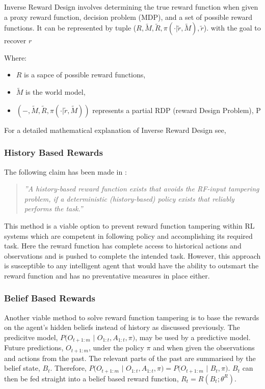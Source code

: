 Inverse Reward Design involves determining the true reward function when given a proxy reward function, decision problem (MDP), and a set of possible reward functions.
It can be represented by tuple ($R, \tilde{M}, \tilde{R}, \pi(\cdot|\tilde{r}, \tilde{M}), \tilde{r}$).
with the goal to recover $r$

Where:
\begin{itemize}
    \item $R$ is a sapce of possible reward functions,
    \item $\tilde{M}$ is the world model,
    \item $(-, \tilde{M}, \tilde{R}, \pi(\cdot|\tilde{r},\tilde{M}))$ represents a partial RDP (reward Design Problem), P
\end{itemize}

For a detailed mathematical explanation of Inverse Reward Design see, \cite{inverse-reward}

\subsubsection{History Based Rewards}
The following claim has been made in \cite{DBLP:journals/corr/abs-1908-04734}:
\begin{quote}
    \emph{''A history-based reward function exists that avoids the RF-input tampering
    problem, if a deterministic (history-based) policy exists that reliably performs the task.''}
\end{quote}

This method is a viable option to prevent reward function tampering within RL systems which are  competent in following policy and accomplishing its required task.
Here the reward function has complete access to historical actions and observations and is pushed to complete the intended task.
However, this approach is susceptible to any intelligent agent that would have the ability to outsmart the reward function and has no preventative measures in place either.

\subsubsection{Belief Based Rewards}
Another viable method to solve reward function tampering is to base the rewards on the agent's hidden beliefs instead of history as discussed previously.
The predicitve model, $P(O_{t+1:m}$ $|$ $O_{1:t}, A_{1:t}, \pi)$, may be used by a predictive model.
Future predictions, $O_{t+1:m}$, under the policy $\pi$ and when given the observations and actions from the past.
The relevant parts of the past are summarised by the belief state, $B_t$.
Therefore, $P(O_{t+1:m}$ $|$ $O_{1:t}, A_{1:t}, \pi) = P(O_{t+1:m}$ $|$ $B_t, \pi)$.
$B_t$ can then be fed straight into a belief based reward function, $R_t = R(B_t;\theta^R)$.


